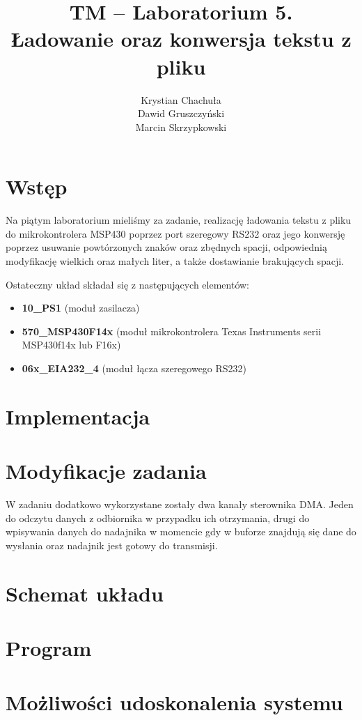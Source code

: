 \documentclass[fleqn]{article}
\title{TM -- Laboratorium 5. \\ \large Ładowanie oraz konwersja tekstu z pliku}
\author{Krystian Chachuła \\ Dawid Gruszczyński \\ Marcin Skrzypkowski}
\begin{document}
\maketitle

\setcounter{page}{0}
\thispagestyle{empty}

\pagebreak

\setcounter{page}{1}

\section{Wstęp}
Na piątym laboratorium mieliśmy za zadanie, realizację ładowania tekstu z pliku do mikrokontrolera MSP430 poprzez port szeregowy RS232 oraz jego konwersję poprzez usuwanie powtórzonych znaków oraz zbędnych spacji, odpowiednią modyfikację wielkich oraz małych liter, a także dostawianie brakujących spacji.


Ostateczny układ składał się z następujących elementów:

\begin{itemize}
	\item \textbf{10\_PS1} (moduł zasilacza)
	\item \textbf{570\_MSP430F14x} (moduł mikrokontrolera Texas Instruments serii MSP430f14x lub F16x)
	\item \textbf{06x\_EIA232\_4} (moduł łącza szeregowego RS232)
\end{itemize}

\section{Implementacja}

\section{Modyfikacje zadania}
W zadaniu dodatkowo wykorzystane zostały dwa kanały sterownika DMA. Jeden do odczytu danych z odbiornika w przypadku ich otrzymania, drugi do wpisywania danych do nadajnika w momencie gdy w buforze znajdują się dane do wysłania oraz nadajnik jest gotowy do transmisji.






\pagebreak
\section{Schemat układu}



\pagebreak
 \section{Program}




\pagebreak
\section{Możliwości udoskonalenia systemu}
\end{document}
